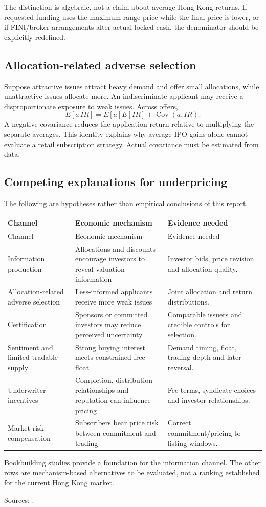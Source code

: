 \documentclass[11pt,a4paper]{article}
\newcommand{\source}[1]{\par{\footnotesize\color{ink}Sources: \cite{#1}.}\par}
\begin{document}
The distinction is algebraic, not a claim about average Hong Kong returns. If requested funding uses the maximum range price while the final price is lower, or if FINI/broker arrangements alter actual locked cash, the denominator should be explicitly redefined.

\subsection{Allocation-related adverse selection}
Suppose attractive issues attract heavy demand and offer small allocations, while unattractive issues allocate more. An indiscriminate applicant may receive a disproportionate exposure to weak issues. Across offers,
\[
E[a\,IR]=E[a]E[IR]+\operatorname{Cov}(a,IR).
\]
A negative covariance reduces the application return relative to multiplying the separate averages. This identity explains why average IPO gains alone cannot evaluate a retail subscription strategy. Actual covariance must be estimated from data.

\subsection{Competing explanations for underpricing}
The following are hypotheses rather than empirical conclusions of this report.
\begin{longtable}{@{}L{3.3cm}L{6.3cm}L{5.9cm}@{}}
\toprule Channel & Economic mechanism & Evidence needed\\\midrule\endfirsthead
\toprule Channel & Economic mechanism & Evidence needed\\\midrule\endhead
Information production & Allocations and discounts encourage investors to reveal valuation information & Investor bids, price revision and allocation quality.\\
Allocation-related adverse selection & Less-informed applicants receive more weak issues & Joint allocation and return distributions.\\
Certification & Sponsors or committed investors may reduce perceived uncertainty & Comparable issuers and credible controls for selection.\\
Sentiment and limited tradable supply & Strong buying interest meets constrained free float & Demand timing, float, trading depth and later reversal.\\
Underwriter incentives & Completion, distribution relationships and reputation can influence pricing & Fee terms, syndicate choices and investor relationships.\\
Market-risk compensation & Subscribers bear price risk between commitment and trading & Correct commitment/pricing-to-listing windows.\\
\bottomrule
\end{longtable}
Bookbuilding studies provide a foundation for the information channel. The other rows are mechanism-based alternatives to be evaluated, not a ranking established for the current Hong Kong market.\source{bookresearch,allocationresearch}
\end{document}
